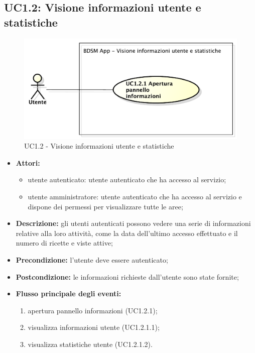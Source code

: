 \pagebreak

\subsection{UC1.2: Visione informazioni utente e statistiche}

\begin{figure}[htbp]
    \centering
    \centerline{\includegraphics[scale=0.6]{./images/UC1_2.pdf}}
    \caption{UC1.2 - Visione informazioni utente e statistiche}
\end{figure}

\begin{itemize}
    \item \textbf{Attori:}
    \begin{itemize}
        \item utente autenticato: utente autenticato che ha accesso al servizio;
        \item utente amministratore: utente autenticato che ha accesso al servizio e dispone dei permessi per visualizzare tutte le aree;
    \end{itemize}
    \item \textbf{Descrizione:} gli utenti autenticati possono vedere una serie di informazioni relative alla 	loro attività, come la data dell'ultimo accesso effettuato e il numero di ricette e viste attive;
    \item \textbf{Precondizione:} l'utente deve essere autenticato;
    \item \textbf{Postcondizione:} le informazioni richieste dall'utente sono state fornite;
    \item \textbf{Flusso principale degli eventi:}
    \begin{enumerate}
        \item apertura pannello informazioni (UC1.2.1);
        \item visualizza informazioni utente (UC1.2.1.1);
        \item visualizza statistiche utente (UC1.2.1.2).
    \end{enumerate}
\end{itemize}

